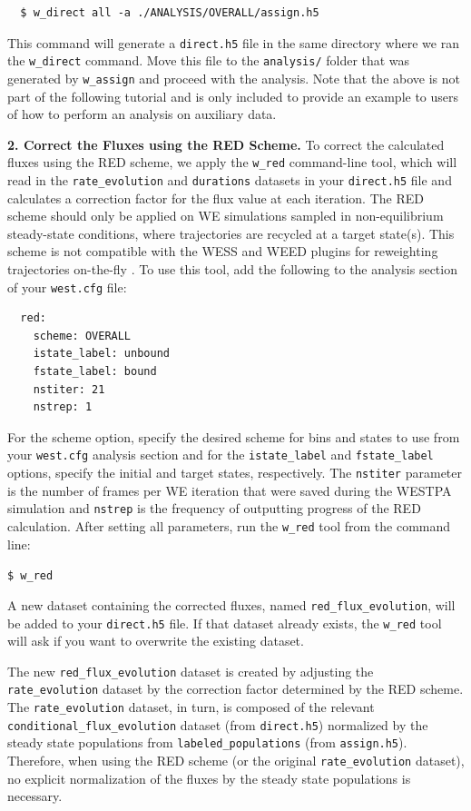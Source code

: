 \begin{verbatim}
  $ w_direct all -a ./ANALYSIS/OVERALL/assign.h5
\end{verbatim}

This command will generate a \verb|direct.h5| file in the same directory where we ran the \verb|w_direct| command.
Move this file to the \verb|analysis/| folder that was generated by \verb|w_assign| and proceed with the analysis.
Note that the above is not part of the following tutorial and is only included to provide an example to users of how to perform an analysis on auxiliary data.

\textbf{2. Correct the Fluxes using the RED Scheme.} To correct the calculated fluxes using the RED scheme, we apply the \verb|w_red| command-line tool, which will read in the \verb|rate_evolution| and \verb|durations| datasets in your \verb|direct.h5| file and calculates a correction factor for the flux value at each iteration. The RED scheme should only be applied on WE simulations sampled in non-equilibrium steady-state conditions, where trajectories are recycled at a target state(s). This scheme is not compatible with the WESS and WEED plugins for reweighting trajectories on-the-fly .
To use this tool, add the following to the analysis section of your \verb|west.cfg| file:
\begin{verbatim}
  red:
    scheme: OVERALL
    istate_label: unbound
    fstate_label: bound
    nstiter: 21
    nstrep: 1
\end{verbatim}

\noindent For the scheme option, specify  the desired scheme for bins and states to use from your \verb|west.cfg| analysis section and for the \verb|istate_label| and \verb|fstate_label| options, specify the initial and target states, respectively.
The \verb|nstiter| parameter is the number of frames per WE iteration that were saved during the WESTPA simulation and \verb|nstrep| is the frequency of outputting progress of the RED calculation. After setting all parameters, run the \verb|w_red| tool from the command line:

\verb|$ w_red|

\noindent A new dataset containing the corrected fluxes, named \verb|red_flux_evolution|, will be added to your \verb|direct.h5| file.
If that dataset already exists, the \verb|w_red| tool will ask if you want to overwrite the existing dataset.

The new \verb|red_flux_evolution| dataset is created by adjusting the \verb|rate_evolution| dataset by the correction factor determined by the RED scheme.
The \verb|rate_evolution| dataset, in turn, is composed of the relevant \verb|conditional_flux_evolution| dataset (from \verb|direct.h5|) normalized by the steady state populations from \verb|labeled_populations| (from \verb|assign.h5|).
Therefore, when using the RED scheme (or the original \verb|rate_evolution| dataset), no explicit normalization of the fluxes by the steady state populations is necessary.

